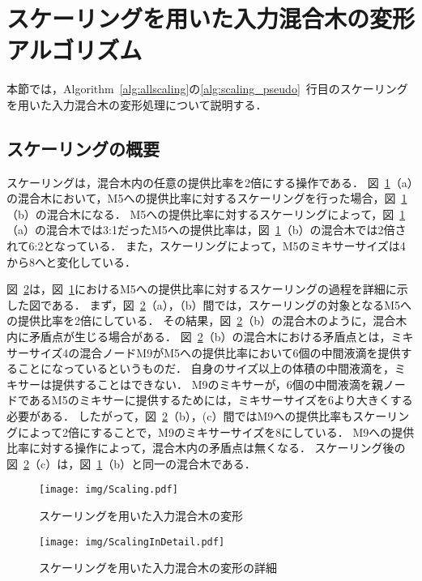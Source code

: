 \section{スケーリングを用いた入力混合木の変形アルゴリズム}
本節では，Algorithm~\ref{alg:allscaling}の\ref{alg:scaling_pseudo}~行目のスケーリングを用いた入力混合木の変形処理について説明する．
\subsection{スケーリングの概要}
スケーリングは，混合木内の任意の提供比率を2倍にする操作である．
図~\ref{fig:Scaling}（a）の混合木において，M5への提供比率に対するスケーリングを行った場合，図~\ref{fig:Scaling}（b）の混合木になる．
M5への提供比率に対するスケーリングによって，図~\ref{fig:Scaling}（a）の混合木では3:1だったM5への提供比率は，図~\ref{fig:Scaling}（b）の混合木では2倍されて6:2となっている．
また，スケーリングによって，M5のミキサーサイズは4から8へと変化している．

図~\ref{fig:ScalingInDetail}は，図~\ref{fig:Scaling}におけるM5への提供比率に対するスケーリングの過程を詳細に示した図である．
まず，図~\ref{fig:ScalingInDetail}（a），（b）間では，スケーリングの対象となるM5への提供比率を2倍にしている．
その結果，図~\ref{fig:ScalingInDetail}（b）の混合木のように，混合木内に矛盾点が生じる場合がある．
図~\ref{fig:ScalingInDetail}（b）の混合木における矛盾点とは，ミキサーサイズ4の混合ノードM9がM5への提供比率において6個の中間液滴を提供することになっているというものだ．
自身のサイズ以上の体積の中間液滴を，ミキサーは提供することはできない．
M9のミキサーが，6個の中間液滴を親ノードであるM5のミキサーに提供するためには，ミキサーサイズを6より大きくする必要がある．
したがって，図~\ref{fig:ScalingInDetail}（b），(c）間ではM9への提供比率もスケーリングによって2倍にすることで，M9のミキサーサイズを8にしている．
M9への提供比率に対する操作によって，混合木内の矛盾点は無くなる．
スケーリング後の図~\ref{fig:ScalingInDetail}（c）は，図~\ref{fig:Scaling}（b）と同一の混合木である．

\begin{figure}[tbp]
 \centering\texttt{[image: img/Scaling.pdf]}
 \caption{スケーリングを用いた入力混合木の変形}\label{fig:Scaling}
\end{figure}

\begin{figure}[tbp]
 \centering\texttt{[image: img/ScalingInDetail.pdf]}
 \caption{スケーリングを用いた入力混合木の変形の詳細}\label{fig:ScalingInDetail}
\end{figure}

